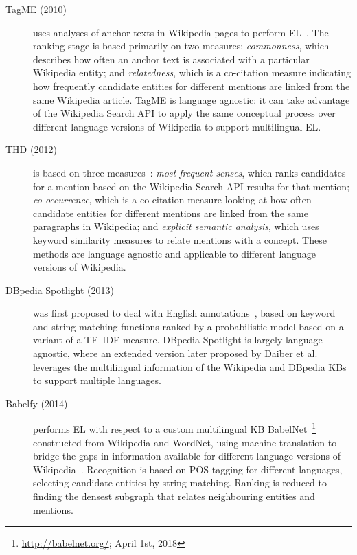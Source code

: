\documentclass{llncs}
\begin{document}
\begin{description}
\item[TagME (2010)] uses analyses of anchor texts in Wikipedia pages to perform EL~\cite{ferragina2010tagme}. The ranking stage is based primarily on two measures: \textit{commonness}, which describes how often an anchor text is associated with a particular Wikipedia entity; and \textit{relatedness}, which is a co-citation measure indicating how frequently candidate entities for different mentions are linked from the same Wikipedia article. TagME is language agnostic: it can take advantage of the Wikipedia Search API to apply the same conceptual process over different language versions of Wikipedia to support multilingual EL.
\item[THD (2012)] is based on three measures~\cite{THD-dojchinovski2012recognizing}: \textit{most frequent senses}, which ranks candidates for a mention based on the Wikipedia Search API results for that mention; \textit{co-occurrence}, which is a co-citation measure looking at how often candidate entities for different mentions are linked from the same paragraphs in Wikipedia; and \textit{explicit semantic analysis}, which uses keyword similarity measures to relate mentions with a concept. These methods are language agnostic and applicable to different language versions of Wikipedia.
\item[DBpedia Spotlight (2013)] was first proposed to deal with English annotations~\cite{mendes2011dbpedia}, based on keyword and string matching functions ranked by a probabilistic model based on a variant of a TF--IDF measure. DBpedia Spotlight is largely language-agnostic, where an extended version later proposed by Daiber et al.~\cite{daiber2013improving} leverages the multilingual information of the Wikipedia and DBpedia KBs to support multiple languages.
\item[Babelfy (2014)] performs EL with respect to a custom multilingual KB BabelNet~\footnote{\url{http://babelnet.org/}; April 1st, 2018} constructed from Wikipedia and WordNet, using machine translation to bridge the gaps in information available for different language versions of Wikipedia~\cite{Babelfy-moro2014entity}. Recognition is based on POS tagging for different languages, selecting candidate entities by string matching. Ranking is reduced to finding the densest subgraph that relates neighbouring entities and mentions.

\end{description}
\end{document}
